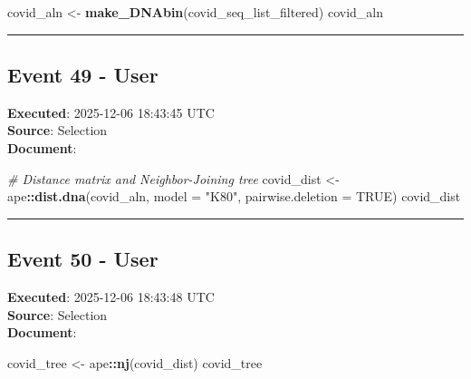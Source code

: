 \documentclass[
  11pt,
]{article}
\newenvironment{Shaded}{\begin{snugshade}}{\end{snugshade}}
\newcommand{\AttributeTok}[1]{\textcolor[rgb]{0.13,0.29,0.53}{#1}}
\newcommand{\CommentTok}[1]{\textcolor[rgb]{0.56,0.35,0.01}{\textit{#1}}}
\newcommand{\ConstantTok}[1]{\textcolor[rgb]{0.56,0.35,0.01}{#1}}
\newcommand{\FunctionTok}[1]{\textcolor[rgb]{0.13,0.29,0.53}{\textbf{#1}}}
\newcommand{\NormalTok}[1]{#1}
\newcommand{\OtherTok}[1]{\textcolor[rgb]{0.56,0.35,0.01}{#1}}
\newcommand{\SpecialCharTok}[1]{\textcolor[rgb]{0.81,0.36,0.00}{\textbf{#1}}}
\newcommand{\StringTok}[1]{\textcolor[rgb]{0.31,0.60,0.02}{#1}}
\begin{document}
\begin{Shaded}
\begin{Highlighting}[]
\NormalTok{covid\_aln }\OtherTok{\textless{}{-}} \FunctionTok{make\_DNAbin}\NormalTok{(covid\_seq\_list\_filtered)}
\NormalTok{covid\_aln}
\end{Highlighting}
\end{Shaded}

\begin{center}\rule{0.5\linewidth}{0.5pt}\end{center}

\subsection{Event 49 - User}\label{event-49---user}

\textbf{Executed}: 2025-12-06 18:43:45 UTC\\
\textbf{Source}: Selection\\
\textbf{Document}:

\begin{Shaded}
\begin{Highlighting}[]
\CommentTok{\# Distance matrix and Neighbor{-}Joining tree}
\NormalTok{covid\_dist }\OtherTok{\textless{}{-}}\NormalTok{ ape}\SpecialCharTok{::}\FunctionTok{dist.dna}\NormalTok{(covid\_aln, }\AttributeTok{model =} \StringTok{"K80"}\NormalTok{, }\AttributeTok{pairwise.deletion =} \ConstantTok{TRUE}\NormalTok{)}
\NormalTok{covid\_dist}
\end{Highlighting}
\end{Shaded}

\begin{center}\rule{0.5\linewidth}{0.5pt}\end{center}

\subsection{Event 50 - User}\label{event-50---user}

\textbf{Executed}: 2025-12-06 18:43:48 UTC\\
\textbf{Source}: Selection\\
\textbf{Document}:

\begin{Shaded}
\begin{Highlighting}[]
\NormalTok{covid\_tree }\OtherTok{\textless{}{-}}\NormalTok{ ape}\SpecialCharTok{::}\FunctionTok{nj}\NormalTok{(covid\_dist)}
\NormalTok{covid\_tree}
\end{Highlighting}
\end{Shaded}
\end{document}
